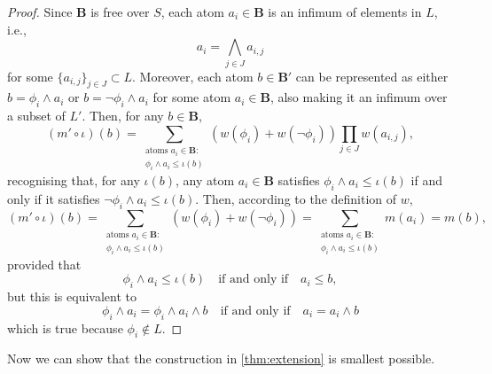 \documentclass{article}
\theoremstyle{definition}
\theoremstyle{remark}
\begin{document}
\begin{proof}
  Since $\mathbf{B}$ is free over $S$, each atom $a_i \in \mathbf{B}$ is an
  infimum of elements in $L$, i.e.,
  \[
    a_i = \bigwedge_{j \in J} a_{i,j}
  \]
  for some $\{ a_{i,j} \}_{j \in J} \subset L$. Moreover, each atom $b \in
  \mathbf{B'}$ can be represented as either $b = \phi_i \land a_i$ or $b =
  \neg\phi_i \land a_i$ for some atom $a_i \in \mathbf{B}$, also making it an
  infimum over a subset of $L'$. Then, for any $b \in \mathbf{B}$,
  \[
    (m' \circ \iota)(b) = \sum_{\substack{\text{atoms } a_i \in \mathbf{B}:\\
        \phi_i \land a_i \le \iota(b)}} (w(\phi_i) + w(\neg\phi_i)) \prod_{j \in
    J} w(a_{i,j}),
  \]
  recognising that, for any $\iota(b)$, any atom $a_i \in \mathbf{B}$ satisfies
  $\phi_i \land a_i \le \iota(b)$ if and only if it satisfies $\neg\phi_i \land
  a_i \le \iota(b)$. Then, according to the definition of $w$,
  \[
    (m' \circ \iota)(b) = \sum_{\substack{\text{atoms } a_i \in \mathbf{B}:\\
        \phi_i \land a_i \le \iota(b)}} (w(\phi_i) + w(\neg\phi_i)) =
    \sum_{\substack{\text{atoms } a_i \in \mathbf{B}:\\ \phi_i \land a_i \le
        \iota(b)}} m(a_i) = m(b),
  \]
  provided that
  \[
    \phi_i \land a_i \le \iota(b) \quad \text{if and only if} \quad a_i \le b,
  \]
  but this is equivalent to
  \[
    \phi_i \land a_i = \phi_i \land a_i \land b \quad \text{if and only if}
    \quad a_i = a_i \land b
  \]
  which is true because $\phi_i \not\in L$.
\end{proof}

Now we can show that the construction in \cref{thm:extension} is smallest
possible.
\end{document}
